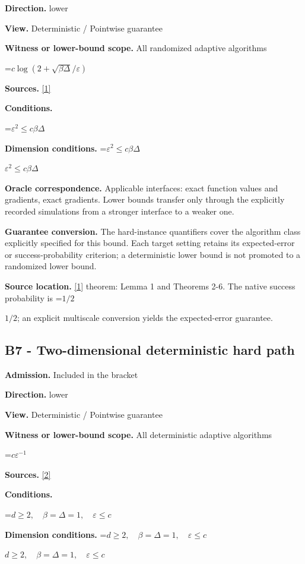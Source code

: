\documentclass[10pt,a4paper]{article}
\newcommand{\AtlasMath}[1]{\par\begingroup\centering\setbox0=\hbox{$\displaystyle #1$}\ifdim\wd0>1.4\linewidth\typeout{ATLAS WIDE FORMULA: \the\wd0}\fi\ifdim\wd0>\linewidth\resizebox{\linewidth}{!}{\box0}\else\box0\fi\par\endgroup}
\newcommand{\AtlasInlineMath}[1]{\begingroup\setbox0=\hbox{$#1$}\ifdim\wd0>.4\linewidth\endgroup\AtlasMath{#1}\else\endgroup$#1$\fi}
\begin{document}
\textbf{Direction.} lower

\textbf{View.} Deterministic / Pointwise guarantee

\textbf{Witness or lower-bound scope.} All randomized adaptive algorithms

\AtlasMath{c\log(2+\sqrt{\beta\Delta}/\varepsilon)}
\textbf{Sources.} \href{https://arxiv.org/pdf/2209.07513}{[1]}

\textbf{Conditions.} 


\AtlasMath{\varepsilon^2\le c\beta\Delta}




\textbf{Dimension conditions.} \AtlasInlineMath{\varepsilon^2\le c\beta\Delta}

\textbf{Oracle correspondence.} Applicable interfaces: exact function values and gradients, exact gradients. Lower bounds transfer only through the explicitly recorded simulations from a stronger interface to a weaker one.

\textbf{Guarantee conversion.} The hard-instance quantifiers cover the algorithm class explicitly specified for this bound. Each target setting retains its expected-error or success-probability criterion; a deterministic lower bound is not promoted to a randomized lower bound.

\textbf{Source location.} \href{https://arxiv.org/pdf/2209.07513}{[1]} theorem: Lemma 1 and Theorems 2-6. The native success probability is \AtlasInlineMath{1/2}; an explicit multiscale conversion yields the expected-error guarantee.

\subsection{B7 - Two-dimensional deterministic hard path}
\textbf{Admission.} Included in the bracket

\textbf{Direction.} lower

\textbf{View.} Deterministic / Pointwise guarantee

\textbf{Witness or lower-bound scope.} All deterministic adaptive algorithms

\AtlasMath{c\varepsilon^{-1}}
\textbf{Sources.} \href{https://arxiv.org/pdf/2310.09157}{[2]}

\textbf{Conditions.} 


\AtlasMath{d\ge2,\quad\beta=\Delta=1,\quad\varepsilon\le c}




\textbf{Dimension conditions.} \AtlasInlineMath{d\ge2,\quad\beta=\Delta=1,\quad\varepsilon\le c}
\end{document}
